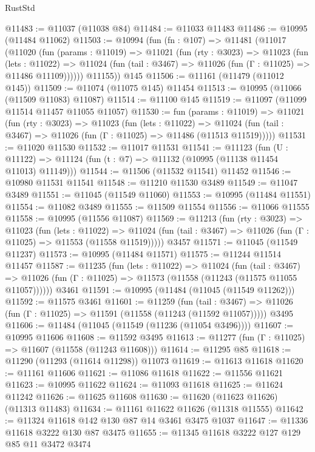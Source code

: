 \begin{lexlean}{RustStd}
\begin{coremodule}
@11483 := @11037 (@11038 @84)
@11484 := @11033 @11483
@11486 := @10995 (@11484 @11062)
@11503 := @10994
    (fun (fn : @107) =>
    @11481
      (@11017
        (@11020
          (fun (params : @11019) =>
          @11021
            (fun (rty : @3023) =>
            @11023
              (fun (lets : @11022) =>
              @11024 (fun (tail : @3467) => @11026 (fun (Γ : @11025) => @11486 @11109))))))
        @11155))
    @145
@11506 := @11161 (@11479 (@11012 @145))
@11509 := @11074 (@11075 @145) @11454
@11513 := @10995 (@11066 (@11509 @11083) @11087)
@11514 := @11100 @145
@11519 := @11097 (@11099 @11514 @11457 @11055 @11057)
@11530 := fun (params : @11019) =>
  @11021
    (fun (rty : @3023) =>
    @11023
      (fun (lets : @11022) =>
      @11024 (fun (tail : @3467) => @11026 (fun (Γ : @11025) => @11486 (@11513 @11519)))))
@11531 := @11020 @11530
@11532 := @11017 @11531
@11541 := @11123
    (fun (U : @11122) => @11124 (fun (t : @7) => @11132 (@10995 (@11138 @11454 @11013) @11149)))
@11544 := @11506 (@11532 @11541) @11452
@11546 := @10980 @11531 @11541
@11548 := @11210 @11530 @3489
@11549 := @11047 @3489
@11551 := @11045 (@11549 @11060)
@11553 := @10995 (@11484 @11551)
@11554 := @11082 @3489
@11555 := @11509 @11554
@11556 := @11066 @11555
@11558 := @10995 (@11556 @11087)
@11569 := @11213
    (fun (rty : @3023) =>
    @11023
      (fun (lets : @11022) =>
      @11024 (fun (tail : @3467) => @11026 (fun (Γ : @11025) => @11553 (@11558 @11519)))))
    @3457
@11571 := @11045 (@11549 @11237)
@11573 := @10995 (@11484 @11571)
@11575 := @11244 @11514 @11457
@11587 := @11235
    (fun (lets : @11022) =>
    @11024
      (fun (tail : @3467) =>
      @11026 (fun (Γ : @11025) => @11573 (@11558 (@11243 (@11575 @11055 @11057))))))
    @3461
@11591 := @10995 (@11484 (@11045 (@11549 @11262)))
@11592 := @11575 @3461
@11601 := @11259
    (fun (tail : @3467) => @11026 (fun (Γ : @11025) => @11591 (@11558 (@11243 (@11592 @11057)))))
    @3495
@11606 := @11484 (@11045 (@11549 (@11236 (@11054 @3496))))
@11607 := @10995 @11606
@11608 := @11592 @3495
@11613 := @11277 (fun (Γ : @11025) => @11607 (@11558 (@11243 @11608)))
@11614 := @11295 @85
@11618 := @11290 (@11293 (@11614 @11298)) @11073
@11619 := @11613 @11618
@11620 := @11161 @11606
@11621 := @11086 @11618
@11622 := @11556 @11621
@11623 := @10995 @11622
@11624 := @11093 @11618
@11625 := @11624 @11242
@11626 := @11625 @11608
@11630 := @11620 (@11623 @11626) (@11313 @11483)
@11634 := @11161 @11622 @11626 (@11318 @11555)
@11642 := @11324 @11618 @142 @130 @87 @14 @3461 @3475 @1037
@11647 := @11336 @11618 @3222 @130 @87 @3475
@11655 := @11345 @11618 @3222 @127 @129 @85 @11 @3472 @3474

\end{coremodule}
\end{lexlean}
